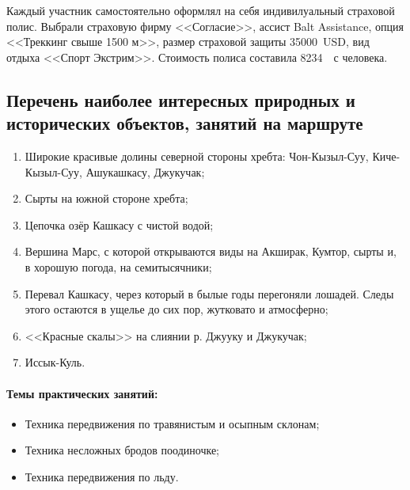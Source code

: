 Каждый участник самостоятельно оформлял на себя индивилуальный страховой полис. Выбрали страховую фирму <<Согласие>>, ассист Balt Assistance, опция <<Треккинг свыше 1500 м>>, размер страховой защиты 35000~USD,  вид отдыха <<Спорт Экстрим>>. Стоимость полиса составила 8234~\faRuble~с человека.

\subsection{Перечень наиболее интересных природных и исторических объектов, занятий на маршруте}
\begin{enumerate}[noitemsep,topsep=0pt,parsep=0pt,partopsep=0pt]
	\item Широкие красивые долины северной стороны хребта: Чон-Кызыл-Суу, Киче-Кызыл-Суу, Ашукашкасу, Джукучак; 
	\item Сырты на южной стороне хребта; 
	\item Цепочка озёр Кашкасу с чистой водой; 
	\item Вершина Марс, с которой открываются виды на Акширак, Кумтор, сырты и, в хорошую погода, на семитысячники; 
	\item Перевал Кашкасу, через который в былые годы перегоняли лошадей. Следы этого остаются в ущелье до сих пор, жутковато и атмосферно; 
	\item <<Красные скалы>> на слиянии р. Джууку и Джукучак;
	\item Иссык-Куль.
\end{enumerate}

\paragraph{Темы практических занятий:}

\begin{itemize}
	\item Техника передвижения по травянистым и осыпным склонам;
	\item Техника несложных бродов поодиночке;
	\item Техника передвижения по льду.
\end{itemize}

\newpage
